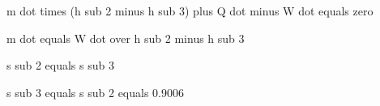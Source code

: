 m dot times (h sub 2 minus h sub 3) plus Q dot minus W dot equals zero

m dot equals W dot over h sub 2 minus h sub 3

s sub 2 equals s sub 3

s sub 3 equals s sub 2 equals 0.9006